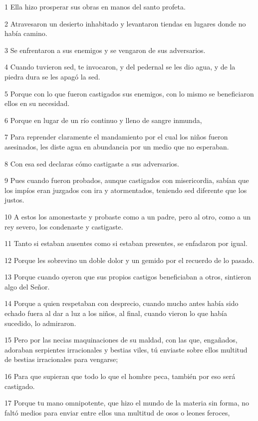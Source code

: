 \par 1 Ella hizo prosperar sus obras en manos del santo profeta.
\par 2 Atravesaron un desierto inhabitado y levantaron tiendas en lugares donde no había camino.
\par 3 Se enfrentaron a sus enemigos y se vengaron de sus adversarios.
\par 4 Cuando tuvieron sed, te invocaron, y del pedernal se les dio agua, y de la piedra dura se les apagó la sed.
\par 5 Porque con lo que fueron castigados sus enemigos, con lo mismo se beneficiaron ellos en su necesidad.
\par 6 Porque en lugar de un río continuo y lleno de sangre inmunda,
\par 7 Para reprender claramente el mandamiento por el cual los niños fueron asesinados, les diste agua en abundancia por un medio que no esperaban.
\par 8 Con esa sed declaras cómo castigaste a sus adversarios.
\par 9 Pues cuando fueron probados, aunque castigados con misericordia, sabían que los impíos eran juzgados con ira y atormentados, teniendo sed diferente que los justos.
\par 10 A estos los amonestaste y probaste como a un padre, pero al otro, como a un rey severo, los condenaste y castigaste.
\par 11 Tanto si estaban ausentes como si estaban presentes, se enfadaron por igual.
\par 12 Porque les sobrevino un doble dolor y un gemido por el recuerdo de lo pasado.
\par 13 Porque cuando oyeron que sus propios castigos beneficiaban a otros, sintieron algo del Señor.
\par 14 Porque a quien respetaban con desprecio, cuando mucho antes había sido echado fuera al dar a luz a los niños, al final, cuando vieron lo que había sucedido, lo admiraron.
\par 15 Pero por las necias maquinaciones de su maldad, con las que, engañados, adoraban serpientes irracionales y bestias viles, tú enviaste sobre ellos multitud de bestias irracionales para vengarse;
\par 16 Para que supieran que todo lo que el hombre peca, también por eso será castigado.
\par 17 Porque tu mano omnipotente, que hizo el mundo de la materia sin forma, no faltó medios para enviar entre ellos una multitud de osos o leones feroces,
